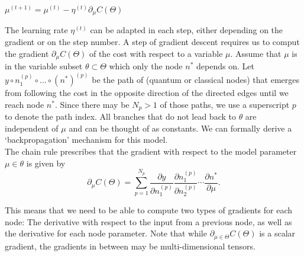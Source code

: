 \documentclass[aps,pra,10pt,twocolumn,groupedaddress,nofootinbib]{revtex4-1}
\theoremstyle{plain}
\begin{document}
\begin{algorithmic}[1]
\For {$\mu \in \Theta $}
\State $\mu^{(t+1)} = \mu^{(t)} - \eta^{(t)} \partial_{\mu} C(\Theta)$
\EndFor
\EndProcedure
\end{algorithmic}

The learning rate $\eta^{(t)}$ can be adapted in each step, either depending on the gradient or on the step number. A step of gradient descent requires us to comput the gradient $\partial_{\mu} C(\Theta)$ of the cost with respect to a variable $\mu$. Assume that $\mu$ is in the variable subset $\theta \subset \Theta$ which only the node $n^*$ depends on. Let $y \circ n^{(p)}_1 \circ ... \circ (n^*)^{(p)}$ be the path of (quantum or classical nodes) that emerges from following the cost in the opposite direction of the directed edges until we reach node $n^*$. Since there may be $N_p > 1$ of those paths, we use a superscript $p$ to denote the path index. All branches that do not lead back to $\theta$ are independent of $\mu$ and can be thought of as constants. We can formally derive a `backpropagation' mechanism for this model.\\

The chain rule prescribes that the gradient with respect to the model parameter $\mu \in \theta$ is given by
\[ \partial_{\mu} C(\Theta) = \sum_{p=1}^{N_p} \frac{\partial y}{\partial n_1^{(p)}} \frac{ \partial n^{(p)}_1}{\partial n^{(p)}_{2}}  \cdots \frac{\partial n^*}{\partial \mu}. \]


This means that we need to be able to compute two types of gradients for each node: The derivative with respect to the input from a previous node, as well as the derivative for each node parameter. Note that while $\partial_{\mu \in \Theta} C(\Theta)$ is a scalar gradient, the gradients in between may be multi-dimensional tensors.
\end{document}
